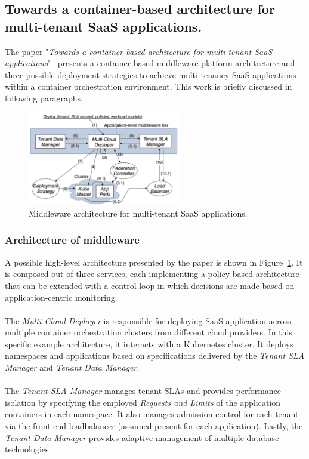 \subsection{Towards a container-based architecture for multi-tenant SaaS applications.}
\label{rw:eddy}
The paper "\textit{Towards a container-based architecture for multi-tenant SaaS applications}"~\cite{TruyenEddy2016Taca} presents a container based middleware platform architecture and three possible deployment strategies to achieve multi-tenancy SaaS applications within a container orchestration environment. This work is briefly discussed in following paragraphs.
\begin{figure}[H]
    \centering
    \includegraphics[width=0.6\textwidth]{chapter-related-work/images-eddy/middleware-eddy.png}
    \caption{Middleware architecture for multi-tenant SaaS applications.~\cite{TruyenEddy2016Taca}}
    \label{fig:eddy-architecture}
\end{figure}
\subsubsection{Architecture of middleware}
A possible high-level architecture presented by the paper is shown in Figure~\ref{fig:eddy-architecture}. It is composed out of three services, each implementing a policy-based architecture that can be extended with a control loop in which decisions are made based on application-centric monitoring.~\cite{TruyenEddy2016Taca}\\\\
The \textit{Multi-Cloud Deployer} is responsible for deploying SaaS application across multiple container orchestration clusters from different cloud providers. In this specific example architecture, it interacts with a Kubernetes cluster. It deploys namespaces and applications based on specifications delivered by the \textit{Tenant SLA Manager} and \textit{Tenant Data Manager}.~\cite{TruyenEddy2016Taca}\\\\
The \textit{Tenant SLA Manager} manages tenant SLAs and provides performance isolation by specifying the employed \textit{Requests and Limits} of the application containers in each namespace. It also manages admission control for each tenant via the front-end loadbalancer (assumed present for each application).
Lastly, the \textit{Tenant Data Manager} provides adaptive management of multiple database technologies.~\cite{TruyenEddy2016Taca}
